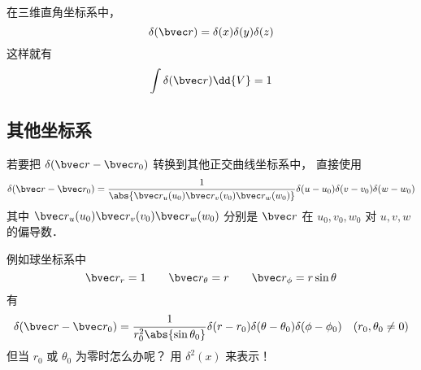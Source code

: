 
\begin{issues}
\issueDraft
\end{issues}


在三维直角坐标系中， 
\begin{equation}
\delta(\bvec r) = \delta(x)\delta(y)\delta(z)
\end{equation}
这样就有
\begin{equation}
\int \delta(\bvec r) \dd{V} = 1
\end{equation}

\subsection{其他坐标系}
若要把 $\delta(\bvec r - \bvec r_0)$ 转换到其他正交曲线坐标系中， 直接使用
\begin{equation}
\delta(\bvec r - \bvec r_0) = \frac{1}{\abs{\bvec r_u(u_0)\bvec r_v(v_0)\bvec r_w(w_0)}}\delta(u - u_0)\delta(v - v_0)\delta(w - w_0)
\end{equation}
其中 $\bvec r_u(u_0)\bvec r_v(v_0)\bvec r_w(w_0)$ 分别是 $\bvec r$ 在 $u_0,v_0,w_0$ 对 $u, v, w$ 的偏导数．

例如球坐标系中
\begin{equation}
\bvec r_r = 1 \qquad \bvec r_\theta = r \qquad \bvec r_\phi = r\sin\theta
\end{equation}
有
\begin{equation}
\delta(\bvec r - \bvec r_0) = \frac{1}{r_0^2\abs{\sin\theta_0}}\delta(r - r_0)\delta(\theta - \theta_0)\delta(\phi - \phi_0)
\quad (r_0, \theta_0 \ne 0)
\end{equation}
但当 $r_0$ 或 $\theta_0$ 为零时怎么办呢？ 用 $\delta^2(x)$ 来表示！
